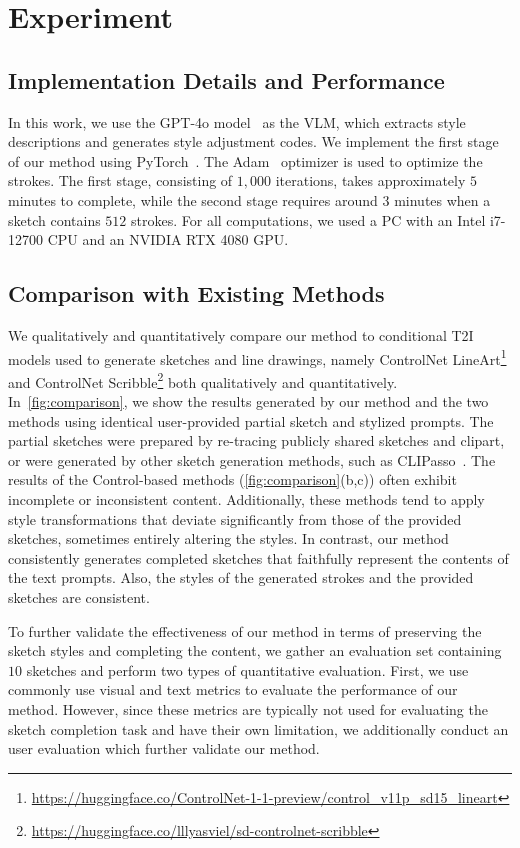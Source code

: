 \section{Experiment}

\subsection{Implementation Details and Performance}
In this work, we use the GPT-4o model~\cite{hurst2024gpt} as the VLM, which extracts style descriptions and generates style adjustment codes.
We implement the first stage of our method using PyTorch~\cite{pytorch}.
The Adam~\cite{adam} optimizer is used to optimize the strokes.
The first stage, consisting of $1,000$ iterations, takes approximately $5$ minutes to complete, while the second stage requires around $3$ minutes when a sketch contains $512$ strokes.
For all computations, we used a PC with an Intel i7-12700 CPU and an NVIDIA RTX 4080 GPU.

\subsection{Comparison with Existing Methods}
\label{sec:result_comparison}
We qualitatively and quantitatively compare our method to conditional T2I models used to generate sketches and line drawings, namely ControlNet LineArt\footnote{\url{https://huggingface.co/ControlNet-1-1-preview/control_v11p_sd15_lineart}} and ControlNet Scribble\footnote{\url{https://huggingface.co/lllyasviel/sd-controlnet-scribble}} both qualitatively and quantitatively.
In~\cref{fig:comparison}, we show the results generated by our method and the two methods using identical user-provided partial sketch and stylized prompts.
The partial sketches were prepared by re-tracing publicly shared sketches and clipart, or were generated by other sketch generation methods, such as CLIPasso~\cite{vinker2022clipasso}.
The results of the Control-based methods (\cref{fig:comparison}(b,c)) often exhibit incomplete or inconsistent content.
Additionally, these methods tend to apply style transformations that deviate significantly from those of the provided sketches, sometimes entirely altering the styles. 
In contrast, our method consistently generates completed sketches that faithfully represent the contents of the text prompts.
Also, the styles of the generated strokes and the provided sketches are consistent.

To further validate the effectiveness of our method in terms of preserving the sketch styles and completing the content, we gather an evaluation set containing $10$ sketches and perform two types of quantitative evaluation.
First, we use commonly use visual and text metrics to evaluate the performance of our method.
However, since these metrics are typically not used for evaluating the sketch completion task and have their own limitation, we additionally conduct an user evaluation which further validate our method.
